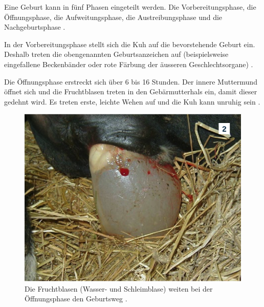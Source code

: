 Eine Geburt kann in fünf Phasen eingeteilt werden. Die Vorbereitungsphase, die Öffnungsphase, die Aufweitungsphase, die Austreibungsphase und die Nachgeburtsphase \citep[S. 6-8 ]{Traulsen2013}.

In der Vorbereitungsphase stellt sich die Kuh auf die bevorstehende Geburt ein. Deshalb treten die obengenannten Geburtsanzeichen auf (beispielsweise eingefallene Beckenbänder oder rote Färbung der äusseren Geschlechtsorgane) \citep[S. 6 ]{Traulsen2013}.  

Die Öffnungsphase erstreckt sich über 6 bis 16 Stunden. Der innere Muttermund öffnet sich und die Fruchtblasen treten in den Gebärmutterhals ein, damit dieser gedehnt wird. Es treten erste, leichte Wehen auf und die Kuh kann unruhig sein \citep[S. 7 ]{Traulsen2013}.  

\begin{figure}[H]
	\center
	\includegraphics[scale=.45]{Grafiken/oeffnungsphase.png}
	\caption{ Die Fruchtblasen (Wasser- und Schleimblase) weiten bei der Öffnungsphase den Geburtsweg \citep[S. 7 ]{Traulsen2013}.}
	\label{fig: Öffnungsphase}
\end{figure}

